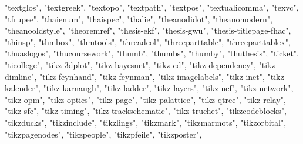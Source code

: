 \documentclass[
]{article}
\newenvironment{Shaded}{\begin{snugshade}}{\end{snugshade}}
\newcommand{\NormalTok}[1]{#1}
\newcommand{\StringTok}[1]{\textcolor[rgb]{0.31,0.60,0.02}{#1}}
\begin{document}
\begin{Shaded}
\begin{Highlighting}[]
\StringTok{"textglos"}\NormalTok{, }\StringTok{"textgreek"}\NormalTok{, }\StringTok{"textopo"}\NormalTok{, }\StringTok{"textpath"}\NormalTok{, }\StringTok{"textpos"}\NormalTok{, }\StringTok{"textualicomma"}\NormalTok{, }
\StringTok{"texvc"}\NormalTok{, }\StringTok{"tfrupee"}\NormalTok{, }\StringTok{"thaienum"}\NormalTok{, }\StringTok{"thaispec"}\NormalTok{, }\StringTok{"thalie"}\NormalTok{, }\StringTok{"theanodidot"}\NormalTok{, }
\StringTok{"theanomodern"}\NormalTok{, }\StringTok{"theanooldstyle"}\NormalTok{, }\StringTok{"theoremref"}\NormalTok{, }\StringTok{"thesis{-}ekf"}\NormalTok{, }
\StringTok{"thesis{-}gwu"}\NormalTok{, }\StringTok{"thesis{-}titlepage{-}fhac"}\NormalTok{, }\StringTok{"thinsp"}\NormalTok{, }\StringTok{"thmbox"}\NormalTok{, }\StringTok{"thmtools"}\NormalTok{, }
\StringTok{"threadcol"}\NormalTok{, }\StringTok{"threeparttable"}\NormalTok{, }\StringTok{"threeparttablex"}\NormalTok{, }\StringTok{"thuaslogos"}\NormalTok{, }
\StringTok{"thucoursework"}\NormalTok{, }\StringTok{"thumb"}\NormalTok{, }\StringTok{"thumbs"}\NormalTok{, }\StringTok{"thumby"}\NormalTok{, }\StringTok{"thuthesis"}\NormalTok{, }\StringTok{"ticket"}\NormalTok{, }
\StringTok{"ticollege"}\NormalTok{, }\StringTok{"tikz{-}3dplot"}\NormalTok{, }\StringTok{"tikz{-}bayesnet"}\NormalTok{, }\StringTok{"tikz{-}cd"}\NormalTok{, }\StringTok{"tikz{-}dependency"}\NormalTok{, }
\StringTok{"tikz{-}dimline"}\NormalTok{, }\StringTok{"tikz{-}feynhand"}\NormalTok{, }\StringTok{"tikz{-}feynman"}\NormalTok{, }\StringTok{"tikz{-}imagelabels"}\NormalTok{, }
\StringTok{"tikz{-}inet"}\NormalTok{, }\StringTok{"tikz{-}kalender"}\NormalTok{, }\StringTok{"tikz{-}karnaugh"}\NormalTok{, }\StringTok{"tikz{-}ladder"}\NormalTok{, }
\StringTok{"tikz{-}layers"}\NormalTok{, }\StringTok{"tikz{-}nef"}\NormalTok{, }\StringTok{"tikz{-}network"}\NormalTok{, }\StringTok{"tikz{-}opm"}\NormalTok{, }\StringTok{"tikz{-}optics"}\NormalTok{, }
\StringTok{"tikz{-}page"}\NormalTok{, }\StringTok{"tikz{-}palattice"}\NormalTok{, }\StringTok{"tikz{-}qtree"}\NormalTok{, }\StringTok{"tikz{-}relay"}\NormalTok{, }\StringTok{"tikz{-}sfc"}\NormalTok{, }
\StringTok{"tikz{-}timing"}\NormalTok{, }\StringTok{"tikz{-}trackschematic"}\NormalTok{, }\StringTok{"tikz{-}truchet"}\NormalTok{, }\StringTok{"tikzcodeblocks"}\NormalTok{, }
\StringTok{"tikzducks"}\NormalTok{, }\StringTok{"tikzinclude"}\NormalTok{, }\StringTok{"tikzlings"}\NormalTok{, }\StringTok{"tikzmark"}\NormalTok{, }\StringTok{"tikzmarmots"}\NormalTok{, }
\StringTok{"tikzorbital"}\NormalTok{, }\StringTok{"tikzpagenodes"}\NormalTok{, }\StringTok{"tikzpeople"}\NormalTok{, }\StringTok{"tikzpfeile"}\NormalTok{, }\StringTok{"tikzposter"}\NormalTok{, }

\end{Highlighting}
\end{Shaded}
\end{document}
